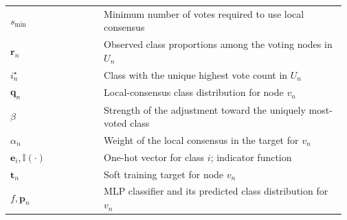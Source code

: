 \begin{table}
\begin{tabular}{@{}p{0.27\linewidth}p{0.70\linewidth}@{}}
\(s_{\min}\) & Minimum number of votes required to use local consensus \\
\(\mathbf r_n\) & Observed class proportions among the voting nodes in \(U_n\) \\
\(i_n^\star\) & Class with the unique highest vote count in \(U_n\) \\
\(\mathbf q_n\) & Local-consensus class distribution for node \(v_n\) \\
\(\beta\) & Strength of the adjustment toward the uniquely most-voted class \\
\(\alpha_n\) & Weight of the local consensus in the target for \(v_n\) \\
\(\mathbf e_i,\mathbb I(\cdot)\) & One-hot vector for class \(i\); indicator function \\
\(\mathbf t_n\) & Soft training target for node \(v_n\) \\
\(f,\mathbf p_n\) & MLP classifier and its predicted class distribution for \(v_n\) \\
\bottomrule
\end{tabular}
\end{table}
